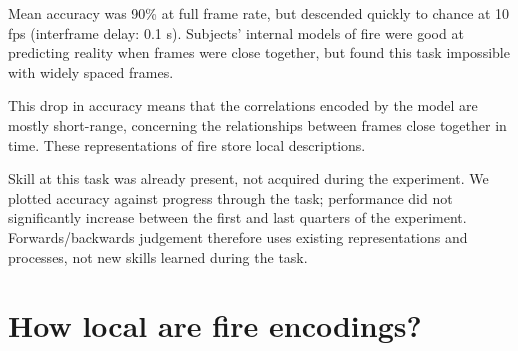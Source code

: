 \documentclass[a4paper]{article}
\begin{document}
Mean accuracy was 90\% at full frame rate, but descended quickly to chance at 10 fps (interframe delay: 0.1 s). Subjects' internal models of fire were good at predicting reality when frames were close together, but found this task impossible with widely spaced frames.

This drop in accuracy means that the correlations encoded by the model are mostly short-range, concerning the relationships between frames close together in time. These representations of fire store local descriptions.

Skill at this task was already present, not acquired during the experiment. We plotted accuracy against progress through the task; performance did not significantly increase between the first and last quarters of the experiment. Forwards/backwards judgement therefore uses existing representations and processes, not new skills learned during the task.


\section{How local are fire encodings?}

%
%
\end{document}
